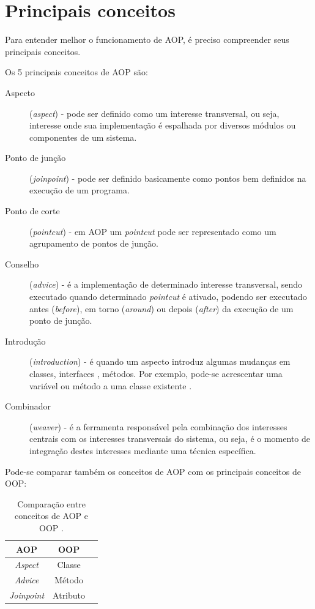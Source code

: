 \documentclass[tc,openright]{iiufrgs}
\begin{document}
\section{Principais conceitos}

Para entender melhor o funcionamento de AOP, é preciso compreender seus principais conceitos. 

Os 5 principais conceitos de AOP são:

\begin{description}
\item [Aspecto] (\textit{aspect}) - pode ser definido como um interesse transversal, ou seja, interesse onde sua implementação é espalhada por diversos módulos ou componentes de um sistema.
\item [Ponto de junção] (\textit{joinpoint}) - pode ser definido basicamente como pontos bem definidos na execução de um programa.
\item [Ponto de corte] (\textit{pointcut}) - em AOP um \textit{pointcut} pode ser representado como um agrupamento de pontos de junção.
\item [Conselho] (\textit{advice}) - é a implementação de determinado interesse transversal, sendo executado quando determinado \textit{pointcut} é ativado, podendo ser executado antes (\textit{before}), em torno (\textit{around}) ou depois (\textit{after}) da execução de um ponto de junção.
\item [Introdução] (\textit{introduction}) - é quando um aspecto introduz algumas mudanças em classes, interfaces , métodos. Por exemplo, pode-se acrescentar uma variável ou método a uma classe existente  \cite{laddad2003aspectj}.
\item [Combinador] (\textit{weaver}) - é a ferramenta responsável pela combinação dos interesses centrais com os interesses transversais do sistema, ou seja,  é o momento de integração destes interesses mediante uma técnica específica.

\end{description}


Pode-se comparar também os conceitos de AOP com os principais conceitos de OOP:

\begin{table}[ht]
	\centering
	\caption{Comparação entre conceitos de AOP e OOP \cite{jacobson2004aspect}.}
	
	\begin{tabular}[h]{c c l}
		\hline 
		\textbf{AOP} & \textbf{OOP} \\
		\hline
		\textit{Aspect}&Classe \\
		\textit{Advice}&Método \\
		\textit{Joinpoint}&Atributo \\
		\hline
	\end{tabular}
	\label{tab:comparacaoAOPOOP}
\end{table}
\end{document}
